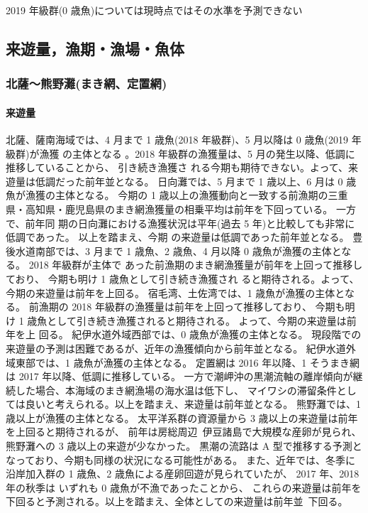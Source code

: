 \documentclass[11pt]{article}
\begin{document}
2019 年級群(0 歳魚)については現時点ではその水準を予測できない

\subsection{来遊量，漁期・漁場・魚体}
\subsubsection{北薩〜熊野灘(まき網、定置網)}
\paragraph{来遊量}
北薩、薩南海域では、4 月まで 1 歳魚(2018 年級群)、5 月以降は 0 歳魚(2019 年級群)が漁獲 の主体となる
。2018 年級群の漁獲量は、5 月の発生以降、低調に推移していることから、
引き続き漁獲さ れる今期も期待できない。よって、来遊量は低調だった前年並となる。
日向灘では、5 月まで 1 歳以上、6 月は 0 歳魚が漁獲の主体となる。
今期の 1 歳以上の漁獲動向と一致する前漁期の三重県・高知県・鹿児島県のまき網漁獲量の相乗平均は前年を下回っている。
一方で、前年同 期の日向灘における漁獲状況は平年(過去 5 年)と比較しても非常に低調であった。
以上を踏まえ、今期 の来遊量は低調であった前年並となる。
豊後水道南部では、3 月まで 1 歳魚、2 歳魚、4 月以降 0 歳魚が漁獲の主体となる。
2018 年級群が主体で あった前漁期のまき網漁獲量が前年を上回って推移しており、
今期も明け 1 歳魚として引き続き漁獲され ると期待される。よって、今期の来遊量は前年を上回る。
宿毛湾、土佐湾では、1 歳魚が漁獲の主体となる。
前漁期の 2018 年級群の漁獲量は前年を上回って推移しており、
今期も明け 1 歳魚として引き続き漁獲されると期待される。
よって、今期の来遊量は前年を上 回る。
紀伊水道外域西部では、0 歳魚が漁獲の主体となる。
現段階での来遊量の予測は困難であるが、近年の漁獲傾向から前年並となる。
紀伊水道外域東部では、1 歳魚が漁獲の主体となる。
定置網は 2016 年以降、1 そうまき網は 2017 年以降、低調に推移している。
一方で潮岬沖の黒潮流軸の離岸傾向が継続した場合、本海域のまき網漁場の海水温は低下し、
マイワシの滞留条件としては良いと考えられる。以上を踏まえ、来遊量は前年並となる。
熊野灘では、1 歳以上が漁獲の主体となる。
太平洋系群の資源量から 3 歳以上の来遊量は前年を上回ると期待されるが、
前年は房総周辺~伊豆諸島で大規模な産卵が見られ、熊野灘への 3 歳以上の来遊が少なかった。
黒潮の流路は A 型で推移する予測となっており、今期も同様の状況になる可能性がある。
また、近年では、冬季に沿岸加入群の 1 歳魚、2 歳魚による産卵回遊が見られていたが、
2017 年、2018 年の秋季は いずれも 0 歳魚が不漁であったことから、
これらの来遊量は前年を下回ると予測される。以上を踏まえ、全体としての来遊量は前年並~下回る。
\end{document}
